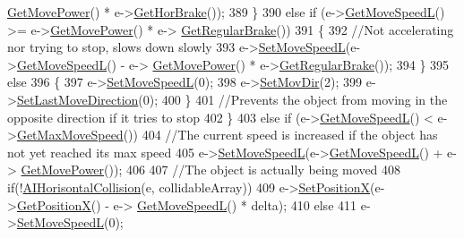 \begin{DoxyCode}
      \hyperlink{classAI_aa6c83658cc7028645288d90dac360ba4}{GetMovePower}() * e->\hyperlink{classAI_a492eb8602d131ddd7d1002a5175c677b}{GetHorBrake}());
389             \}
390             \textcolor{keywordflow}{else} \textcolor{keywordflow}{if} (e->\hyperlink{classAI_a727dd212a4f6dea5030399943b66a285}{GetMoveSpeedL}() >= e->\hyperlink{classAI_aa6c83658cc7028645288d90dac360ba4}{GetMovePower}() * e->
      \hyperlink{classAI_a12164015cfb14576341e0cd31939927a}{GetRegularBrake}())
391             \{
392                 \textcolor{comment}{//Not accelerating nor trying to stop, slows down slowly}
393                 e->\hyperlink{classAI_a7e52788a6f93f78feaa0c8867f454888}{SetMoveSpeedL}(e->\hyperlink{classAI_a727dd212a4f6dea5030399943b66a285}{GetMoveSpeedL}() - e->
      \hyperlink{classAI_aa6c83658cc7028645288d90dac360ba4}{GetMovePower}() * e->\hyperlink{classAI_a12164015cfb14576341e0cd31939927a}{GetRegularBrake}());
394             \}
395             \textcolor{keywordflow}{else}
396             \{
397                 e->\hyperlink{classAI_a7e52788a6f93f78feaa0c8867f454888}{SetMoveSpeedL}(0);
398                 e->\hyperlink{classAI_a7b1fa9a0546e462e633bbdcbbf12eb50}{SetMovDir}(2);
399                 e->\hyperlink{classAI_abc21616a023e18fe33740326b22b21fa}{SetLastMoveDirection}(0);
400             \}
401             \textcolor{comment}{//Prevents the object from moving in the opposite direction if it tries to stop}
402         \}
403         \textcolor{keywordflow}{else} \textcolor{keywordflow}{if} (e->\hyperlink{classAI_a727dd212a4f6dea5030399943b66a285}{GetMoveSpeedL}() < e->\hyperlink{classAI_a7b6da292ee6fde22465b2a956c1c1aff}{GetMaxMoveSpeed}())
404             \textcolor{comment}{//The current speed is increased if the object has not yet reached its max speed}
405             e->\hyperlink{classAI_a7e52788a6f93f78feaa0c8867f454888}{SetMoveSpeedL}(e->\hyperlink{classAI_a727dd212a4f6dea5030399943b66a285}{GetMoveSpeedL}() + e->
      \hyperlink{classAI_aa6c83658cc7028645288d90dac360ba4}{GetMovePower}());
406 
407         \textcolor{comment}{//The object is actually being moved}
408         \textcolor{keywordflow}{if}(!\hyperlink{classPhysics_a1655e3e284cf31eeb54502eb9dcc1e78}{AIHorisontalCollision}(e, collidableArray))
409             e->\hyperlink{classAI_a5436f878f8f02597de9ec5ebfdcc7cd9}{SetPositionX}(e->\hyperlink{classAI_ade2ee4c9c75cdf9f4edd85227193e73d}{GetPositionX}() - e->
      \hyperlink{classAI_a727dd212a4f6dea5030399943b66a285}{GetMoveSpeedL}() * delta);
410         \textcolor{keywordflow}{else}
411             e->\hyperlink{classAI_a7e52788a6f93f78feaa0c8867f454888}{SetMoveSpeedL}(0);

\end{DoxyCode}

